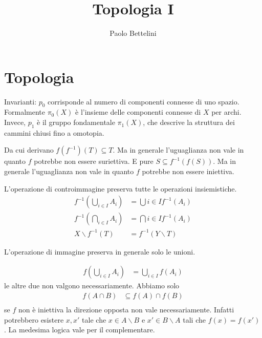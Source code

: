 \documentclass[a4paper]{article}
\title{Topologia I}
\author{Paolo Bettelini}
\date{}
\begin{document}
\maketitle
\tableofcontents

\section{Topologia}

Invarianti: \(p_0\) corrisponde al numero di componenti connesse di uno spazio.
Formalmente \(\pi_0(X)\) è l'insieme delle componenti connesse di \(X\) per archi.
Invece, \(p_1\) è il gruppo fondamentale \(\pi_1(X)\), che descrive la struttura dei cammini
chiusi fino a omotopia.




Da cui derivano \(f(f^{-1})(T) \subseteq T\).
Ma in generale l'uguaglianza non vale in quanto \(f\) potrebbe non essere suriettiva.
E pure \(S \subseteq f^{-1}(f(S))\).
Ma in generale l'uguaglianza non vale in quanto \(f\) potrebbe non essere iniettiva.

L'operazione di controimmagine preserva tutte le operazioni insiemistiche.
\begin{align*}
    f^{-1} \left(\bigcup_{i\in I} A_i\right) &= \bigcup{i\in I} f^{-1}(A_i) \\
    f^{-1} \left(\bigcap_{i\in I} A_i\right) &= \bigcap{i\in I} f^{-1}(A_i) \\
    X \backslash f^{-1}(T) &= f^{-1}(Y \backslash T)
\end{align*}

L'operazione di immagine preserva in generale solo le unioni.

\begin{align*}
    f\left(\bigcup_{i\in I} A_i\right) &= \bigcup_{i\in I} f(A_i)
\end{align*}
le altre due non valgono necessariamente. Abbiamo solo
\begin{align*}
    f(A\cap B) &\subseteq f(A) \cap f(B) \\
\end{align*}
se \(f\) non è iniettiva la direzione opposta non vale necessariamente.
Infatti potrebbero esistere \(x,x'\) tale che \(x \in A \backslash B\)
e \(x' \in B \backslash A\) tali che \(f(x) = f(x')\).
La medesima logica vale per il complementare.
\end{document}

